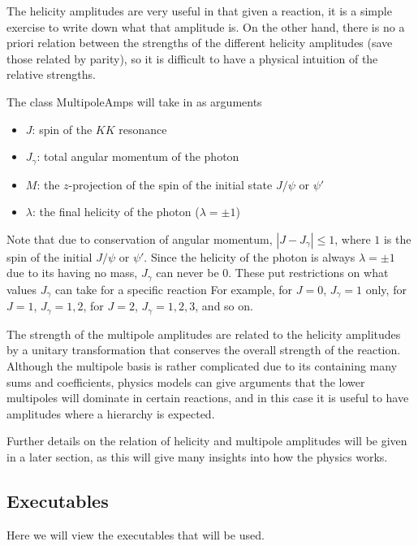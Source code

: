 \documentclass[11pt]{article}
\begin{document}
\begin{itemize}
The helicity amplitudes are very useful in that given a reaction, it
is a simple exercise to write down what that amplitude is. On the
other hand, there is no a priori relation between the strengths of the
different helicity amplitudes (save those related by parity), so it is
difficult to have a physical intuition of the relative strengths.

The class MultipoleAmps will take in as arguments
\begin{itemize}
\item $J$: spin of the $KK$ resonance
\item $J_{\gamma}$: total angular momentum of the photon
\item $M$: the $z$-projection of the spin of the initial state
  $J/\psi$ or $\psi'$
\item $\lambda$: the final helicity of the photon ($\lambda = \pm 1$)
\end{itemize}

Note that due to conservation of angular momentum, $|J - J_{\gamma}|
\leq 1$, where $1$ is the spin of the initial $J/\psi$ or
$\psi'$. Since the helicity of the photon is always $\lambda = \pm 1$
due to its having no mass, $J_{\gamma}$ can never be $0$. These put
restrictions on what values $J_{\gamma}$ can take for a specific
reaction For example, for $J=0$, $J_{\gamma} = 1$ only, for $J=1$,
$J_{\gamma} = 1, 2$, for $J=2$, $J_{\gamma} = 1, 2, 3$, and so on.

The strength of the multipole amplitudes are related to the helicity
amplitudes by a unitary transformation that conserves the overall
strength of the reaction. Although the
multipole basis is rather complicated due to its containing many sums
and coefficients, physics models can give arguments that the lower
multipoles will dominate in certain reactions, and in this case it is
useful to have amplitudes where a hierarchy is expected.

Further details on the relation of helicity and multipole amplitudes
will be given in a later section, as this will give many insights into
how the physics works.

\end{itemize}

\subsection{Executables}
Here we will view the executables that will be used.
\end{document}
